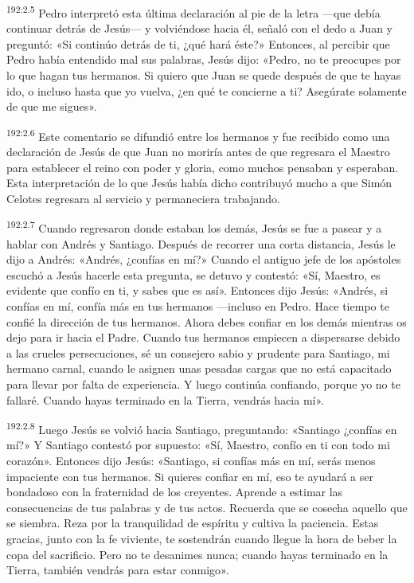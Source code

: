 \par 
\textsuperscript{192:2.5} Pedro interpretó esta última declaración al pie de la letra ---que debía continuar detrás de Jesús--- y volviéndose hacia él, señaló con el dedo a Juan y preguntó: «Si continúo detrás de ti, ¿qué hará éste?» Entonces, al percibir que Pedro había entendido mal sus palabras, Jesús dijo: «Pedro, no te preocupes por lo que hagan tus hermanos. Si quiero que Juan se quede después de que te hayas ido, o incluso hasta que yo vuelva, ¿en qué te concierne a ti? Asegúrate solamente de que me sigues».

\par 
\textsuperscript{192:2.6} Este comentario se difundió entre los hermanos y fue recibido como una declaración de Jesús de que Juan no moriría antes de que regresara el Maestro para establecer el reino con poder y gloria, como muchos pensaban y esperaban. Esta interpretación de lo que Jesús había dicho contribuyó mucho a que Simón Celotes regresara al servicio y permaneciera trabajando.

\par 
\textsuperscript{192:2.7} Cuando regresaron donde estaban los demás, Jesús se fue a pasear y a hablar con Andrés y Santiago. Después de recorrer una corta distancia, Jesús le dijo a Andrés: «Andrés, ¿confías en mí?» Cuando el antiguo jefe de los apóstoles escuchó a Jesús hacerle esta pregunta, se detuvo y contestó: «Sí, Maestro, es evidente que confío en ti, y sabes que es así». Entonces dijo Jesús: «Andrés, si confías en mí, confía más en tus hermanos ---incluso en Pedro. Hace tiempo te confié la dirección de tus hermanos. Ahora debes confiar en los demás mientras os dejo para ir hacia el Padre. Cuando tus hermanos empiecen a dispersarse debido a las crueles persecuciones, sé un consejero sabio y prudente para Santiago, mi hermano carnal, cuando le asignen unas pesadas cargas que no está capacitado para llevar por falta de experiencia. Y luego continúa confiando, porque yo no te fallaré. Cuando hayas terminado en la Tierra, vendrás hacia mí».

\par 
\textsuperscript{192:2.8} Luego Jesús se volvió hacia Santiago, preguntando: «Santiago ¿confías en mí?» Y Santiago contestó por supuesto: «Sí, Maestro, confío en ti con todo mi corazón». Entonces dijo Jesús: «Santiago, si confías más en mí, serás menos impaciente con tus hermanos. Si quieres confiar en mí, eso te ayudará a ser bondadoso con la fraternidad de los creyentes. Aprende a estimar las consecuencias de tus palabras y de tus actos. Recuerda que se cosecha aquello que se siembra. Reza por la tranquilidad de espíritu y cultiva la paciencia. Estas gracias, junto con la fe viviente, te sostendrán cuando llegue la hora de beber la copa del sacrificio. Pero no te desanimes nunca; cuando hayas terminado en la Tierra, también vendrás para estar conmigo».

